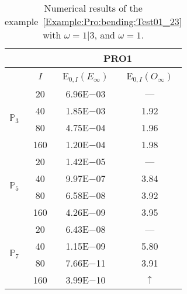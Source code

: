 \begin{table}[H]
\caption{Numerical results of the example~\ref{Example:Pro:bending:Test01_23} with $\omega=1|3$, and $\omega=1$.}
\setlength{\tabcolsep}{5pt}
\centering
\begin{tabular}{@{}l c c c@{}}
\toprule
 &  & \multicolumn{2}{c}{PRO1}\\
\midrule
 & $I$ & E$_{0,I}(E_{\infty})$ & E$_{0,I}(O_{\infty})$\\
\midrule
\multirow{4}{*}{$\mathbb{P}_{3}$} & 20 & 6.96E$-$03 & ---\\
 & 40 & 1.85E$-$03 & 1.92\\
 & 80 & 4.75E$-$04 & 1.96\\
 & 160 & 1.20E$-$04 & 1.98\\
\midrule
\multirow{4}{*}{$\mathbb{P}_{5}$} & 20 & 1.42E$-$05 & ---\\
 & 40 & 9.97E$-$07 & 3.84\\
 & 80 & 6.58E$-$08 & 3.92\\
 & 160 & 4.26E$-$09 & 3.95\\
\midrule
\multirow{4}{*}{$\mathbb{P}_{7}$} & 20 & 6.43E$-$08 & ---\\
 & 40 & 1.15E$-$09 & 5.80\\
 & 80 & 7.66E$-$11 & 3.91\\
 & 160 & 3.99E$-$10 & $\uparrow$\\
\bottomrule
\end{tabular}
\label{Table:PRO:test_01_23_test6}
\end{table}
